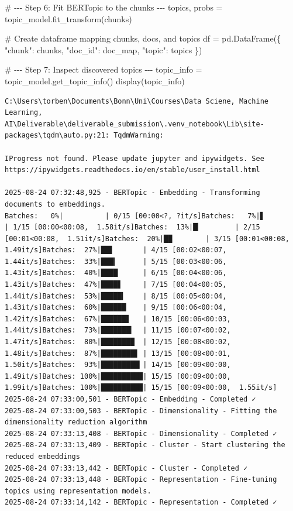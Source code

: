 \documentclass[
  letterpaper,
  DIV=11,
  numbers=noendperiod]{scrartcl}
\newenvironment{Shaded}{\begin{snugshade}}{\end{snugshade}}
\newcommand{\CommentTok}[1]{\textcolor[rgb]{0.37,0.37,0.37}{#1}}
\newcommand{\NormalTok}[1]{\textcolor[rgb]{0.00,0.23,0.31}{#1}}
\newcommand{\OperatorTok}[1]{\textcolor[rgb]{0.37,0.37,0.37}{#1}}
\newcommand{\StringTok}[1]{\textcolor[rgb]{0.13,0.47,0.30}{#1}}
\begin{document}
\begin{Shaded}
\begin{Highlighting}[]
\CommentTok{\# {-}{-}{-} Step 6: Fit BERTopic to the chunks {-}{-}{-}}
\NormalTok{topics, probs }\OperatorTok{=}\NormalTok{ topic\_model.fit\_transform(chunks)}

\CommentTok{\# Create dataframe mapping chunks, docs, and topics}
\NormalTok{df }\OperatorTok{=}\NormalTok{ pd.DataFrame(\{}
    \StringTok{"chunk"}\NormalTok{: chunks,}
    \StringTok{"doc\_id"}\NormalTok{: doc\_map,}
    \StringTok{"topic"}\NormalTok{: topics}
\NormalTok{\})}

\CommentTok{\# {-}{-}{-} Step 7: Inspect discovered topics {-}{-}{-}}
\NormalTok{topic\_info }\OperatorTok{=}\NormalTok{ topic\_model.get\_topic\_info()}
\NormalTok{display(topic\_info)}
\end{Highlighting}
\end{Shaded}

\begin{verbatim}
C:\Users\torben\Documents\Bonn\Uni\Courses\Data Sciene, Machine Learning, AI\Deliverable\deliverable_submission\.venv_notebook\Lib\site-packages\tqdm\auto.py:21: TqdmWarning:

IProgress not found. Please update jupyter and ipywidgets. See https://ipywidgets.readthedocs.io/en/stable/user_install.html

2025-08-24 07:32:48,925 - BERTopic - Embedding - Transforming documents to embeddings.
Batches:   0%|          | 0/15 [00:00<?, ?it/s]Batches:   7%|▋         | 1/15 [00:00<00:08,  1.58it/s]Batches:  13%|█▎        | 2/15 [00:01<00:08,  1.51it/s]Batches:  20%|██        | 3/15 [00:01<00:08,  1.49it/s]Batches:  27%|██▋       | 4/15 [00:02<00:07,  1.44it/s]Batches:  33%|███▎      | 5/15 [00:03<00:06,  1.43it/s]Batches:  40%|████      | 6/15 [00:04<00:06,  1.43it/s]Batches:  47%|████▋     | 7/15 [00:04<00:05,  1.44it/s]Batches:  53%|█████▎    | 8/15 [00:05<00:04,  1.43it/s]Batches:  60%|██████    | 9/15 [00:06<00:04,  1.42it/s]Batches:  67%|██████▋   | 10/15 [00:06<00:03,  1.44it/s]Batches:  73%|███████▎  | 11/15 [00:07<00:02,  1.47it/s]Batches:  80%|████████  | 12/15 [00:08<00:02,  1.48it/s]Batches:  87%|████████▋ | 13/15 [00:08<00:01,  1.50it/s]Batches:  93%|█████████▎| 14/15 [00:09<00:00,  1.49it/s]Batches: 100%|██████████| 15/15 [00:09<00:00,  1.99it/s]Batches: 100%|██████████| 15/15 [00:09<00:00,  1.55it/s]
2025-08-24 07:33:00,501 - BERTopic - Embedding - Completed ✓
2025-08-24 07:33:00,503 - BERTopic - Dimensionality - Fitting the dimensionality reduction algorithm
2025-08-24 07:33:13,408 - BERTopic - Dimensionality - Completed ✓
2025-08-24 07:33:13,409 - BERTopic - Cluster - Start clustering the reduced embeddings
2025-08-24 07:33:13,442 - BERTopic - Cluster - Completed ✓
2025-08-24 07:33:13,448 - BERTopic - Representation - Fine-tuning topics using representation models.
2025-08-24 07:33:14,142 - BERTopic - Representation - Completed ✓
\end{verbatim}
\end{document}
